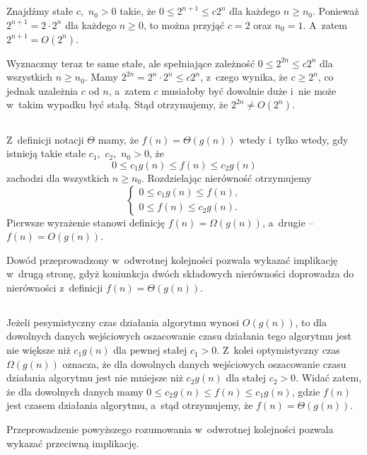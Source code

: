 \subsection{} %
Znajdźmy stałe $c$,~$n_0>0$ takie, że $0\le2^{n+1}\le c2^n$ dla każdego $n\ge n_0$. Ponieważ $2^{n+1}=2\cdot2^n$ dla każdego $n\ge0$, to można przyjąć $c=2$ oraz $n_0=1$. A~zatem $2^{n+1}=O(2^n)$.

Wyznaczmy teraz te same stałe, ale spełniające zależność $0\le2^{2n}\le c2^n$ dla wszystkich $n\ge n_0$. Mamy $2^{2n}=2^n\cdot2^n\le c2^n$, z~czego wynika, że $c\ge2^n$, co jednak uzależnia $c$ od $n$, a~zatem $c$ musiałoby być dowolnie duże i~nie może w~takim wypadku być stałą. Stąd otrzymujemy, że $2^{2n}\ne O(2^n)$.

\subsection{} %
Z~definicji notacji $\Theta$ mamy, że $f(n)=\Theta(g(n))$ wtedy i~tylko wtedy, gdy istnieją takie stałe $c_1$,~$c_2$,~$n_0>0$, że
\[
	0 \le c_1g(n) \le f(n) \le c_2g(n)
\]
zachodzi dla wszystkich $n\ge n_0$. Rozdzielając nierówność otrzymujemy
\[
	\begin{cases}
		0 \le c_1g(n) \le f(n), \\
		0 \le f(n) \le c_2g(n).
	\end{cases}
\]
Pierwsze wyrażenie stanowi definicję $f(n)=\Omega(g(n))$, a~drugie -- $f(n)=O(g(n))$.

Dowód przeprowadzony w~odwrotnej kolejności pozwala wykazać implikację w~drugą stronę, gdyż koniunkcja dwóch składowych nierówności doprowadza do nierówności z~definicji $f(n)=\Theta(g(n))$.

\subsection{} %
Jeżeli pesymistyczny czas działania algorytmu wynosi $O(g(n))$, to dla dowolnych danych wejściowych oszacowanie czasu działania tego algorytmu jest nie większe niż $c_1g(n)$ dla pewnej stałej $c_1>0$. Z~kolei optymistyczny czas $\Omega(g(n))$ oznacza, że dla dowolnych danych wejściowych oszacowanie czasu działania algorytmu jest nie mniejsze niż $c_2g(n)$ dla stałej $c_2>0$. Widać zatem, że dla dowolnych danych mamy $0\le c_2g(n)\le f(n)\le c_1g(n)$, gdzie $f(n)$ jest czasem działania algorytmu, a~stąd otrzymujemy, że $f(n)=\Theta(g(n))$.

Przeprowadzenie powyższego rozumowania w~odwrotnej kolejności pozwala wykazać przeciwną implikację.

